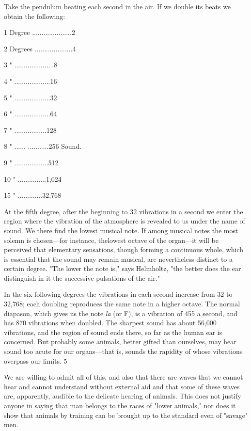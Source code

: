 Take the pendulum beating each second in the air. If we double its beats we obtain the
following:

1 Degree .....................2

2 Degrees ....................4

3 " .....................8

4 " ...................16

5 " ...................32

6 " ...................64

7 " .................128

8 " ...... ...........256 Sound.

9 " ..................512

10 " ...............1,024

15 " .............32,768

At the fifth degree, after the beginning to 32 vibrations in a second we enter the region where
the vibration of the atmosphere is revealed to us under the name of sound. We there find the
lowest musical note. If among musical notes the most solemn is chosen—for instance, thelowest octave of the organ—it will be perceived that elementary sensations, though forming a
continuous whole, which is essential that the sound may remain musical, are nevertheless
distinct to a certain degree. "The lower the note is," says Helmholtz, "the better does the ear
distinguish in it the successive pulsations of the air."

In the six following degrees the vibrations in each second increase from 32 to 32,768; each
doubling reproduces the same note in a higher octave. The normal diapason, which gives us
the note \textit{la} (or F), is a vibration of 455 a second, and has 870 vibrations when doubled. The
sharpest sound has about 56,000 vibrations, and the region of sound ends there, so far as the
human ear is concerned. But probably some animals, better gifted than ourselves, may hear
sound too acute for our organs—that is, sounds the rapidity of whose vibrations overpass our
limits. 5

We are willing to admit all of this, and also that there are waves that we cannot hear and
cannot understand without external aid and that some of these waves are, apparently, audible
to the delicate hearing of animals. This does not justify anyone in saying that man belongs to
the races of "lower animals," nor does it show that animals by training can be brought up to
the standard even of "savage" men.

